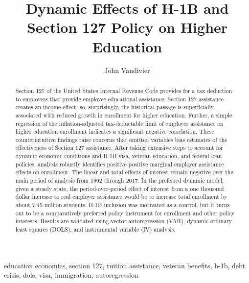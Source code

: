 \documentclass[review]{elsarticle}
\begin{document}
\begin{frontmatter}

    \title{
        Dynamic Effects of H-1B and Section 127 Policy on Higher Education
    }

    \author[mymainaddress]{John Vandivier} %
    \address[mymainaddress]{4400 University Dr, Fairfax, VA 22030}

    \begin{abstract}
        Section 127 of the United States Internal Revenue Code provides for a tax deduction to employers that provide employee educational assistance.
        Section 127 assistance creates an income effect, so, surprisingly,
        the historical passage is superficially associated with reduced growth in enrollment for higher education.
        Further, a simple regression of the inflation-adjusted tax-deductable limit of employer assistance on higher education enrollment indicates a significant negative correlation.
        These counterintuitive findings raise concerns that omitted variables bias estimates of the effectiveness of Section 127 assistance.
        After taking extensive steps to account for dynamic economic conditions and H-1B visa, veteran education, and federal loan policies,
        analysis robustly identifies positive positive marginal employer assistance effects on enrollment.
        The linear and total effects of interest remain negative over the main period of analysis from 1992 through 2017.
        In the preferred dynamic model, given a steady state,
        the period-over-period effect of interest from a one thousand dollar increase to real employer assistance would be to increase total enrollment by about 7.45 million students.
        H-1B inclusion was motivated as a control, but it turns out to be a comparatively preferred policy instrument for enrollment and other policy interests.
        Results are validated using vector autoregression (VAR), dynamic ordinary least squares (DOLS), and instrumental variable (IV) analysis.
    \end{abstract}

    \begin{keyword}
        education economics, section 127, tuition assistance, veteran benefits, h-1b, debt crisis, dols, visa, immigration, autoregression %
        \MSC[2010] %
    \end{keyword}
\end{frontmatter}
\end{document}
